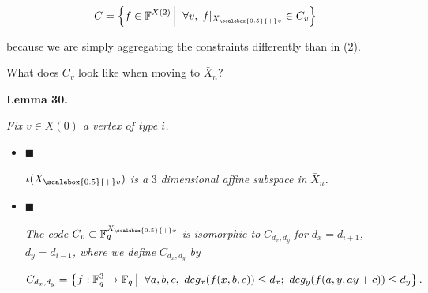 \[\begin{gathered}
C=\left\{f\in\mathbb{F}^{X(2)}\left|\;\vphantom{f\in\mathbb{F}^{X(2)}\forall v,\;f|_{{X}_{\scalebox{0.5}{+}v}}\in C_{v}}\right.\forall v,\;f|_{{X}_{\scalebox{0.5}{+}v}}\in C_{v}\right\}
\end{gathered}\]


because we are simply aggregating the constraints differently than in (2).\par




What does $C_{v}$ look like when moving to $\bar{X}_{n}$?\par





\par\medskip\noindent\textbf{
\textbf{Lemma 30}\textbf{.}
}\par



\emph{Fix $v\in X(0)$ a vertex of type $i$.}\par


\begin{itemize}


\item[] 
$\blacksquare$ 


$\iota({X}_{\scalebox{0.5}{+}v})$\emph{ is a }$3$\emph{ dimensional affine subspace in }$\bar{X}_{n}$\emph{.}\par





\item[] 
$\blacksquare$ 


\emph{The code }$C_{v}\subset\mathbb{F}_{q}^{{X}_{\scalebox{0.5}{+}v}}$\emph{ is isomorphic to }$C_{d_{x},d_{y}}$\emph{ for }$d_{x}=d_{i+1}$\emph{, }$d_{y}=d_{i-1}$\emph{, where
we define }$C_{d_{x},d_{y}}$\emph{ by}\par


\[\begin{gathered}
C_{d_{x},d_{y}}=\left\{f:\mathbb{F}_{q}^{3}\to\mathbb{F}_{q}\left|\;\vphantom{f:\mathbb{F}_{q}^{3}\to\mathbb{F}_{q}\forall a,b,c,\,\,deg_{x}(f(x,b,c))\leq d_{x};\,\,deg_{y}(f(a,y,ay+c))\leq d_{y}}\right.\forall a,b,c,\,\,deg_{x}(f(x,b,c))\leq d_{x};\,\,deg_{y}(f(a,y,ay+c))\leq d_{y}\right\}.
\end{gathered}\]





\end{itemize}



